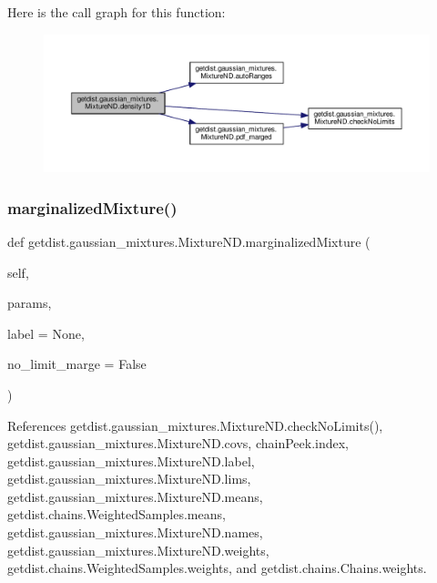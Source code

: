 Here is the call graph for this function\+:
\nopagebreak
\begin{figure}[H]
\begin{center}
\leavevmode
\includegraphics[width=350pt]{classgetdist_1_1gaussian__mixtures_1_1MixtureND_a19dac60689b4c4e7772ffa807aad2dc0_cgraph}
\end{center}
\end{figure}
\mbox{\label{classgetdist_1_1gaussian__mixtures_1_1MixtureND_a9336c58f7855163a171ea12a4d4bdbd1}} 
\subsubsection{\texorpdfstring{marginalized\+Mixture()}{marginalizedMixture()}}
{\footnotesize\ttfamily def getdist.\+gaussian\+\_\+mixtures.\+Mixture\+N\+D.\+marginalized\+Mixture (\begin{DoxyParamCaption}\item[{}]{self,  }\item[{}]{params,  }\item[{}]{label = {\ttfamily None},  }\item[{}]{no\+\_\+limit\+\_\+marge = {\ttfamily False} }\end{DoxyParamCaption})}



References getdist.\+gaussian\+\_\+mixtures.\+Mixture\+N\+D.\+check\+No\+Limits(), getdist.\+gaussian\+\_\+mixtures.\+Mixture\+N\+D.\+covs, chain\+Peek.\+index, getdist.\+gaussian\+\_\+mixtures.\+Mixture\+N\+D.\+label, getdist.\+gaussian\+\_\+mixtures.\+Mixture\+N\+D.\+lims, getdist.\+gaussian\+\_\+mixtures.\+Mixture\+N\+D.\+means, getdist.\+chains.\+Weighted\+Samples.\+means, getdist.\+gaussian\+\_\+mixtures.\+Mixture\+N\+D.\+names, getdist.\+gaussian\+\_\+mixtures.\+Mixture\+N\+D.\+weights, getdist.\+chains.\+Weighted\+Samples.\+weights, and getdist.\+chains.\+Chains.\+weights.

